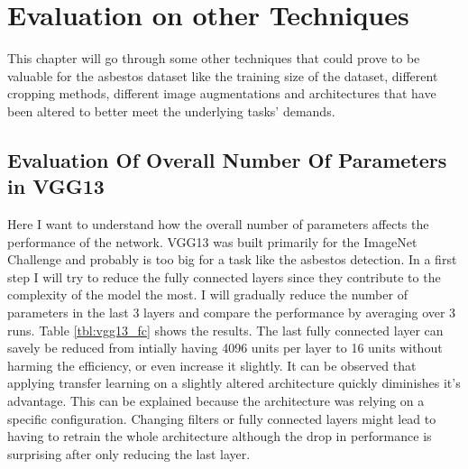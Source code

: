 \chapter{Evaluation on other Techniques}

This chapter will go through some other techniques that could prove to be valuable for the asbestos dataset like the training size of the dataset, different cropping methods, different image augmentations and architectures that have been altered to better meet the underlying tasks' demands.

\section{Evaluation Of Overall Number Of Parameters in VGG13}

Here I want to understand how the overall number of parameters affects the performance of the network. VGG13 was built primarily for the ImageNet Challenge and probably is too big for a task like the asbestos detection. In a first step I will try to reduce the fully connected layers since they  contribute to the complexity of the model the most. I will gradually reduce the number of parameters in the last 3 layers and compare the performance by averaging over 3 runs. Table \ref{tbl:vgg13_fc} shows the results. The last fully connected layer can savely be reduced from intially having 4096 units per layer to 16 units without harming the efficiency, or even increase it slightly. It can be observed that applying transfer learning on a slightly altered architecture quickly diminishes it's advantage. This can be explained because the architecture was relying on a specific configuration. Changing filters or fully connected layers might lead to having to retrain the whole architecture although the drop in performance is surprising after only reducing the last layer.

